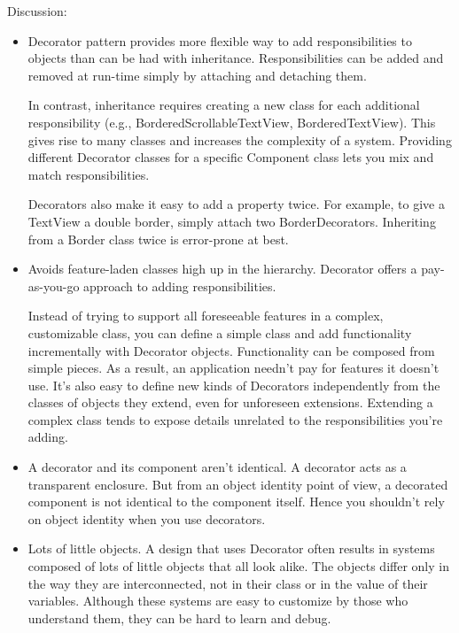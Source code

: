 \documentclass[11pt]{report}
\begin{document}
Discussion:
\begin{itemize}
\item Decorator pattern provides more flexible way to add responsibilities to objects than can be had with 
inheritance. Responsibilities can be added and removed at run-time simply by 
attaching and detaching them. 

In contrast, inheritance requires creating a new class for each additional 
responsibility (e.g., BorderedScrollableTextView, BorderedTextView). This gives rise to many classes and increases 
the complexity of a system. Providing different Decorator classes for a specific Component class lets 
you mix and match responsibilities. 

Decorators also make it easy to add a property twice. For example, to give a 
TextView a double border, simply attach two BorderDecorators. Inheriting from a Border class twice is error-prone at 
best.

\item Avoids feature-laden classes high up in the hierarchy. Decorator offers a pay-as-you-go approach to adding 
responsibilities. 

Instead of trying to support all foreseeable features in a complex, customizable class, you can 
define a simple class and add functionality incrementally with Decorator objects. Functionality can be composed from 
simple pieces. As a result, an application needn't pay for features it doesn't use. It's also easy to define new 
kinds of Decorators independently from the classes of objects they extend, even for unforeseen extensions. Extending 
a complex class tends to expose details unrelated to the responsibilities you're adding.

\item A decorator and its component aren't identical. A decorator acts as a transparent enclosure. But from an 
object identity point of view, a decorated component is not identical to the component itself. Hence you shouldn't 
rely on object identity when you use decorators.

\item Lots of little objects. A design that uses Decorator often results in systems composed of lots of little 
objects that all look alike. The objects differ only in the way they are interconnected, not in their class or in 
the value of their variables. Although these systems are easy to customize by those who understand them, they can be 
hard to learn and debug.

\end{itemize}
\end{document}
